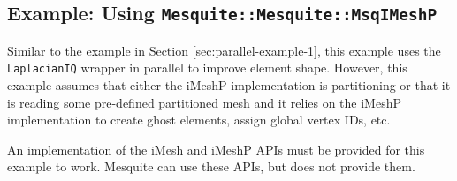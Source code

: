 \subsection{Example: Using \texttt{Mesquite::Mesquite::MsqIMeshP}}

Similar to the example in Section \ref{sec:parallel-example-1}, this example uses the \texttt{LaplacianIQ} wrapper in parallel to improve element shape.  However, this example assumes that either the iMeshP implementation is partitioning or that it is reading some pre-defined partitioned mesh and it relies on the iMeshP implementation to create ghost elements, assign global vertex IDs, etc.  

An implementation of the iMesh and iMeshP APIs must be provided for this example to work.  Mesquite can use these APIs, but does not provide them.

